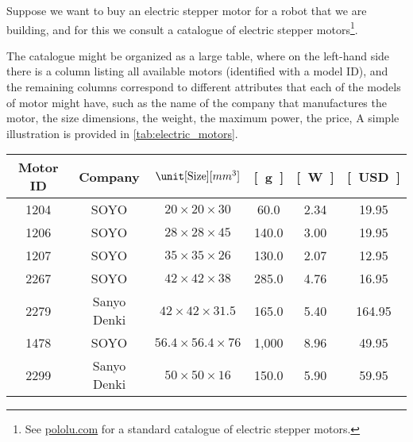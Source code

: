 \begin{example}[Relabelling]
    Suppose we want to buy an electric stepper motor for a robot that we are building, and for this we consult a catalogue of electric stepper motors\footnote{See \href{https://www.pololu.com/category/87/stepper-motors}{pololu.com} for a standard catalogue of electric stepper motors.
    }.

    The catalogue might be organized as a large table, where on the left-hand side there is a column listing all available motors (identified with a model ID), and the remaining columns correspond to different attributes that each of the models of motor might have, such as the name of the company that manufactures the motor, the size dimensions, the weight, the maximum power, the price, \etc
    A simple illustration is provided in \cref{tab:electric_motors}.

    \begin{table*}[h]
        \centering
        \begin{tabular}{c|c|c|c|c|c}
            Motor ID      & Company              & $\unit[\text{Size}]{[mm^3]}$  & \unit[Weight]{[g]} & \unit[Max Power]{[W]}
                          & \unit[Cost]{[USD]} \\
            \hline
            \textsf{1204} & \textsf{SOYO}        & $20 \times 20 \times 30$      & 60.0               & 2.34                  & 19.95 \\
            \textsf{1206} & \textsf{SOYO}        & $28 \times 28 \times 45$      & 140.0              & 3.00                  & 19.95 \\
            \textsf{1207} & \textsf{SOYO}        & $35 \times 35\times 26$       & 130.0              & 2.07                  & 12.95 \\
            \textsf{2267} & \textsf{SOYO}        & $42 \times 42 \times38$       & 285.0              & 4.76                  & 16.95 \\
            \textsf{2279} & \textsf{Sanyo Denki} & $42 \times 42 \times 31.5$    & 165.0              & 5.40                  & 164.95 \\
            \textsf{1478} & \textsf{SOYO}        & $56.4 \times 56.4 \times 76 $ & 1,000              & 8.96                  & 49.95 \\
            \textsf{2299} & \textsf{Sanyo Denki} & $50 \times 50 \times 16$      & 150.0              & 5.90                  & 59.95
        \end{tabular}


\end{table*}
\end{example}
